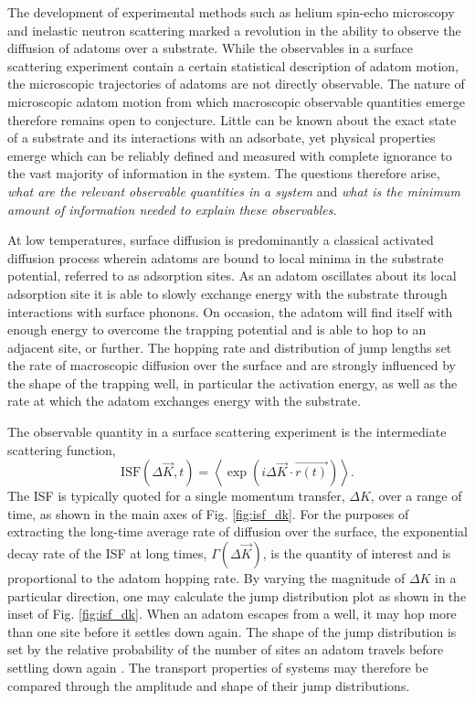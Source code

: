 \documentclass[7pt]{article}
\begin{document}
The development of experimental methods such as helium spin-echo microscopy\cite{FouquetHSEM, JardineHSEM} and inelastic neutron scattering\cite{Wright1983} marked a revolution in the ability to observe the diffusion of adatoms over a substrate. While the observables in a surface scattering experiment contain a certain statistical description of adatom motion\cite{vanHowe}, the microscopic trajectories of adatoms are not directly observable. The nature of microscopic adatom motion from which macroscopic observable quantities emerge therefore remains open to conjecture. Little can be known about the exact state of a substrate and its interactions with an adsorbate, yet physical properties emerge which can be reliably defined and measured with complete ignorance to the vast majority of information in the system. The questions therefore arise, \emph{what are the relevant observable quantities in a system} and \emph{what is the minimum amount of information needed to explain these observables}. 

At low temperatures, surface diffusion is predominantly a classical activated diffusion process\cite{someone} wherein adatoms are bound to local minima in the substrate potential, referred to as adsorption sites. As an adatom oscillates about its local adsorption site it is able to slowly exchange energy with the substrate through interactions with surface phonons. On occasion, the adatom will find itself with enough energy to overcome the trapping potential and is able to hop to an adjacent site, or further. The hopping rate and distribution of jump lengths set the rate of macroscopic diffusion over the surface and are strongly influenced by the shape of the trapping well, in particular the activation energy, as well as the rate at which the adatom exchanges energy with the substrate.

The observable quantity in a surface scattering experiment is the intermediate scattering function,
$$
\mathrm{ISF}(\Delta{\vec{K}}, t) = \left<\exp\left(i\Delta{\vec{K}}\cdot\vec{r(t)}\right)\right>.
$$
The ISF is typically quoted for a single momentum transfer, $\Delta{K}$, over a range of time, as shown in the main axes of Fig. \ref{fig:isf_dk}. For the purposes of extracting the long-time average rate of diffusion over the surface, the exponential decay rate of the ISF at long times, $\Gamma(\Delta{\vec{K}})$, is the quantity of interest and is proportional to the adatom hopping rate\cite{Chudley}. By varying the magnitude of $\Delta{K}$ in a particular direction, one may calculate the jump distribution plot as shown in the inset of Fig. \ref{fig:isf_dk}. When an adatom escapes from a well, it may hop more than one site before it settles down again. The shape of the jump distribution is set by the relative probability of the number of sites an adatom travels before settling down again \cite{Chudley}. The transport properties of systems may therefore be compared through the amplitude and shape of their jump distributions.
\end{document}
